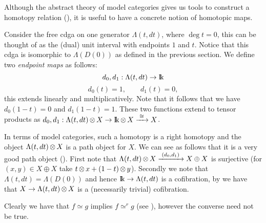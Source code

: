 
Although the abstract theory of model categories gives us tools to construct a homotopy relation (), it is useful to have a concrete notion of homotopic maps.

Consider the free cdga on one generator $\Lambda(t, dt)$, where \linebreak $\deg{t} = 0$, this can be thought of as the (dual) unit interval with endpoints $1$ and $t$. Notice that this cdga is isomorphic to \linebreak $\Lambda(D(0))$ as defined in the previous section. We define two \emph{endpoint maps} as follows:
$$ d_0, d_1 : \Lambda(t, dt) \to \mathrm{I\!k} $$
$$ d_0(t) = 1, \qquad d_1(t) = 0, $$
this extends linearly and multiplicatively. Note that it follows that we have $d_0(1-t) = 0$ and $d_1(1-t) = 1$. These two functions extend to tensor products as $d_0, d_1: \Lambda(t, dt) \operatorname*{\otimes} X \to \mathrm{I\!k} \operatorname*{\otimes} X \xrightarrow{\,\,{\cong}\,\,} X$.


In terms of model categories, such a homotopy is a right homotopy and the object $\Lambda(t, dt) \operatorname*{\otimes} X$ is a path object for $X$. We can see as follows that it is a very good path object (). First note that $\Lambda(t, dt) \operatorname*{\otimes} X \xrightarrow{\,\,{(d_0, d_1)}\,\,} X \oplus X$ is surjective (for $(x, y) \in X \oplus X$ take $t \operatorname*{\otimes} x + (1-t) \operatorname*{\otimes} y$). Secondly we note that $\Lambda(t, dt) = \Lambda(D(0))$ and hence $\mathrm{I\!k} \to \Lambda(t, dt)$ is a cofibration, by  we have that $X \to \Lambda(t, dt) \operatorname*{\otimes} X$ is a (necessarily trivial) cofibration.

Clearly we have that $f \simeq g$ implies $f \simeq^r g$ (see ), however the converse need not be true.



